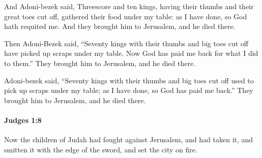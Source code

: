 			\begin{versebox}
					\item[BHS] 
					\item[ASV] And Adoni-bezek said, Threescore and ten kings, having their thumbs and their great toes cut off, gathered their food under my table: as I have done, so God hath requited me. And they brought him to Jerusalem, and he died there.
					\item[NIV] Then Adoni-Bezek said, “Seventy kings with their thumbs and big toes cut off have picked up scraps under my table. Now God has paid me back for what I did to them.” They brought him to Jerusalem, and he died there.
					\item[NRSV] Adoni-bezek said, “Seventy kings with their thumbs and big toes cut off used to pick up scraps under my table; as I have done, so God has paid me back.” They brought him to Jerusalem, and he died there.
			\end{versebox}

		\paragraph{Judges 1:8} %
			\label{JUDGES-1-8}

			Now the children of Judah had fought against Jerusalem, and had taken it, and smitten it with the edge of the sword, and set the city on fire.

